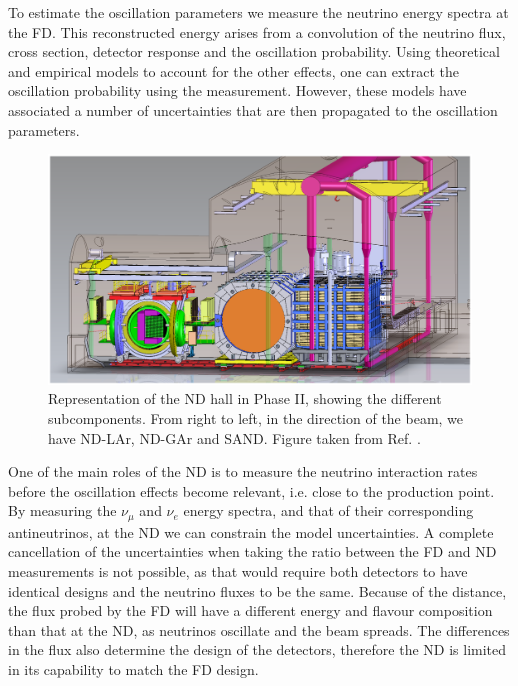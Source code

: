 To estimate the oscillation parameters we measure the neutrino energy spectra at the FD. This reconstructed energy arises from a convolution of the neutrino flux, cross section, detector response and the oscillation probability. Using theoretical and empirical models to account for the other effects, one can extract the oscillation probability using the measurement. However, these models have associated a number of uncertainties that are then propagated to the oscillation parameters.

\begin{figure}[t]
	\centering
	\includegraphics[width=0.95\linewidth]{Images/DUNE/ND/nd_hall}
	\caption[Representation of the ND hall in Phase II, showing the different subcomponents.]{Representation of the ND hall in Phase II, showing the different subcomponents. From right to left, in the direction of the beam, we have ND-LAr, ND-GAr and SAND. Figure taken from Ref. \cite{DUNE2021NDCDR}.}
	\label{fig:dune_nd}
\end{figure}

One of the main roles of the ND is to measure the neutrino interaction rates before the oscillation effects become relevant, i.e. close to the production point. By measuring the $\nu_{\mu}$ and $\nu_{e}$ energy spectra, and that of their corresponding antineutrinos, at the ND we can constrain the model uncertainties. A complete cancellation of the uncertainties when taking the ratio between the FD and ND measurements is not possible, as that would require both detectors to have identical designs and the neutrino fluxes to be the same. Because of the distance, the flux probed by the FD will have a different energy and flavour composition than that at the ND, as neutrinos oscillate and the beam spreads. The differences in the flux also determine the design of the detectors, therefore the ND is limited in its capability to match the FD design.

